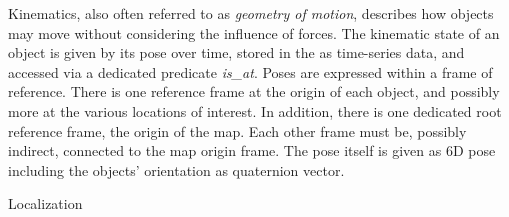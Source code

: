 Kinematics, also often referred to as \emph{geometry of motion}, describes how objects may move without considering the influence of forces.
The kinematic state of an object is given by its pose over time, stored in the \neemexp as time-series data, and accessed via a dedicated predicate \emph{is\_at}.
Poses are expressed within a frame of reference.
There is one reference frame at the origin of each object, and possibly more at the various locations of interest.
In addition, there is one dedicated root reference frame, the origin of the map.
Each other frame must be, possibly indirect, connected to the map origin frame.
The pose itself is given as 6D pose including the objects' orientation as quaternion vector.

\begin{ODP}{Localization}
\end{ODP}

